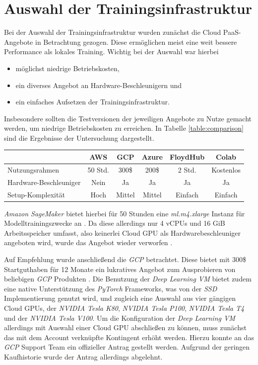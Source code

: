 \section{Auswahl der Trainingsinfrastruktur}

Bei der Auswahl der Trainingsinfrastruktur wurden zunächst die Cloud PaaS-Angebote in Betrachtung gezogen. Diese ermöglichen meist eine weit bessere Performance als lokales Training. Wichtig bei der Auswahl war hierbei 

\begin{itemize}
	\item möglichst niedrige Betriebskosten,
	\item ein diverses Angebot an Hardware-Beschleunigern und
	\item ein einfaches Aufsetzen der Trainingsinfrastruktur.
\end{itemize}

Insbesondere sollten die Testversionen der jeweiligen Angebote zu Nutze gemacht werden, um niedrige Betriebskosten zu erreichen. In Tabelle \ref{table:comparison} sind die Ergebnisse der Untersuchung dargestellt. 

\begin{center}
	\begin{tabular}[h]{l|c|c|c|c|c}
		& AWS & GCP & Azure & FloydHub & Colab \\
		\hline
		Nutzungsrahmen & 50 Std. & 300\$ & 200\$ & 2 Std. & Kostenlos \\
		Hardware-Beschleuniger & Nein & Ja & Ja & Ja & Ja \\
		Setup-Komplexität & Hoch & Mittel & Mittel & Einfach & Einfach \\
	\end{tabular}
	\label{table:comparison}
\end{center}

\textit{Amazon SageMaker} bietet hierbei für 50 Stunden eine \textit{ml.m4.xlarge} Instanz für Modelltrainingszwecke an \cite{AmazonWebServices.2020}. Da diese allerdings nur 4 vCPUs und 16 GiB Arbeitsspeicher umfasst, also keinerlei Cloud GPU als Hardwarebeschleuniger angeboten wird, wurde das Angebot wieder verworfen \cite{AmazonWebServices.20200314b}.

Auf Empfehlung wurde anschließend die \textit{GCP} betrachtet. Diese bietet mit 300\$ Startguthaben für 12 Monate ein lukratives Angebot zum Ausprobieren von beliebigen \textit{GCP} Produkten \cite{GoogleCloudPlatform.20200314b}. Die Benutzung der \textit{Deep Learning VM} bietet zudem eine native Unterstützung des \textit{PyTorch} Frameworks, was von der \textit{SSD} Implementierung genutzt wird, und zugleich eine Auswahl aus vier gängigen Cloud GPUs, der \textit{NVIDIA Tesla K80}, \textit{NVIDIA Tesla P100}, \textit{NVIDIA Tesla T4} und der \textit{NVIDIA Tesla V100}. Um die Konfiguration der \textit{Deep Learning VM} allerdings mit Auswahl einer Cloud GPU abschließen zu können, muss zunächst das mit dem Account verknüpfte Kontingent erhöht werden. Hierzu konnte an das \textit{GCP} Support Team ein offizieller Antrag gestellt werden. Aufgrund der geringen Kaufhistorie wurde der Antrag allerdings abgelehnt. 

